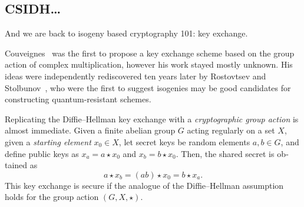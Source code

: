 \begin{otherlanguage}{english}
  
  \section{CSIDH\dots}
  And we are back to isogeny based cryptography 101: key exchange.

  Couveignes~\cite{cryptoeprint:2006:291} was the first to propose a
  key exchange scheme based on the group action of complex
  multiplication, however his work stayed mostly unknown. His ideas
  were independently rediscovered ten years later by Rostovtsev and
  Stolbunov~\cite{rostovtsev+stolbunov06}, who were the first to
  suggest isogenies may be good candidates for constructing
  quantum-resistant schemes.

  Replicating the Diffie--Hellman key exchange with a
  \emph{cryptographic group action} is almost immediate. Given a
  finite abelian group $G$ acting regularly on a set $X$, given a
  \emph{starting element} $x_0\in X$, let secret keys be random
  elements $a,b\in G$, and define public keys as $x_a = a\star x_0$
  and $x_b = b\star x_0$. Then, the shared secret is obtained as
  \[a\star x_b = (ab)\star x_0 = b\star x_a.\] %
  This key exchange is secure if the analogue of the Diffie--Hellman
  assumption holds for the group action $(G,X,\star)$.


\end{otherlanguage}
